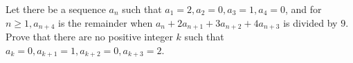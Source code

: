 Let there be a sequence $a_n$ such that $a_1 = 2,a_2 = 0, a_3 = 1, a_4 = 0$, and for $n \ge 1, a_{n+4}$ is the remainder
when $a_n + 2a_{n+1} + 3a_{n+2} + 4a_{n+3}$ is divided by $9$. Prove that there are no positive integer $k$ such that
$a_k = 0, a_{k+1} = 1, a_{k+2} = 0,a_{k+3} = 2$.